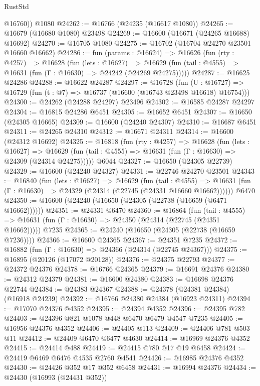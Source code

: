 \begin{lexlean}{RustStd}
\begin{coremodule}
{\begin{coremodule}
{{{{{{{{{{{{{{{{{{{{{{{{{{{{{{{{{{{{{{{{{{{{{{{{{{{{{{{        @16760))
    @1080
@24262 := @16766 (@24235 (@16617 @1080))
@24265 := @16679 (@16680 @1080) @23498
@24269 := @16600 (@16671 (@24265 @16688) @16692)
@24270 := @16705 @1080
@24275 := @16702 (@16704 @24270 @23501 @16660 @16662)
@24286 := fun (params : @16624) =>
  @16626
    (fun (rty : @4257) =>
    @16628
      (fun (lets : @16627) =>
      @16629 (fun (tail : @4555) => @16631 (fun (Γ : @16630) => @24242 (@24269 @24275)))))
@24287 := @16625 @24286
@24288 := @16622 @24287
@24297 := @16728
    (fun (U : @16727) => @16729 (fun (t : @7) => @16737 (@16600 (@16743 @23498 @16618) @16754)))
@24300 := @24262 (@24288 @24297) @23496
@24302 := @16585 @24287 @24297
@24304 := @16815 @24286 @6451
@24305 := @16652 @6451
@24307 := @16650 (@24305 @16665)
@24309 := @16600 (@24240 @24307)
@24310 := @16687 @6451
@24311 := @24265 @24310
@24312 := @16671 @24311
@24314 := @16600 (@24312 @16692)
@24325 := @16818
    (fun (rty : @4257) =>
    @16628
      (fun (lets : @16627) =>
      @16629 (fun (tail : @4555) => @16631 (fun (Γ : @16630) => @24309 (@24314 @24275)))))
    @6044
@24327 := @16650 (@24305 @22739)
@24329 := @16600 (@24240 @24327)
@24331 := @22746 @24270 @23501
@24343 := @16840
    (fun (lets : @16627) =>
    @16629
      (fun (tail : @4555) =>
      @16631 (fun (Γ : @16630) => @24329 (@24314 (@22745 (@24331 @16660 @16662))))))
    @6470
@24350 := @16600 (@24240 (@16650 (@24305 (@22738 (@16659 (@6471 @16662))))))
@24351 := @24331 @6470
@24360 := @16864
    (fun (tail : @4555) => @16631 (fun (Γ : @16630) => @24350 (@24314 (@22745 (@24351 @16662)))))
    @7235
@24365 := @24240 (@16650 (@24305 (@22738 (@16659 @7236))))
@24366 := @16600 @24365
@24367 := @24351 @7235
@24372 := @16882 (fun (Γ : @16630) => @24366 (@24314 (@22745 @24367)))
@24375 := @16895 (@20126 (@17072 @20128))
@24376 := @24375 @22793
@24377 := @24372 @24376
@24378 := @16766 @24365
@24379 := @16691 @24376
@24380 := @24312 @24379
@24381 := @16600 @24380
@24383 := @16698 @24376 @22744
@24384 := @24383 @24367
@24388 := @24378 (@24381 @24384) (@16918 @24239)
@24392 := @16766 @24380 @24384 (@16923 @24311)
@24394 := @17070 @24376 @4352
@24395 := @24394 @4352
@24396 := @24395 @782
@24403 := @24396 @821 @1078 @448 @6470 @6479 @4547 @7235
@24405 := @16956 @24376 @4352
@24406 := @24405 @113
@24409 := @24406 @781 @503 @11
@24412 := @24409 @6470 @6477 @4630
@24414 := @16969 @24376 @4352
@24415 := @24414 @488
@24419 := @24415 @780 @17 @19 @6458
@24424 := @24419 @6469 @6476 @4535 @2760 @4541
@24426 := @16985 @24376 @4352
@24430 := @24426 @352 @17 @352 @6458
@24431 := @16994 @24376
@24434 := @24430 (@16993 (@24431 @352))
}}}}}}}}}}}}}}}}}}}}}}}}}}}}}}}}}}}}}}}}}}}}}}}}}}}}}}}
\end{coremodule}}
\end{coremodule}
\end{lexlean}
